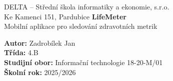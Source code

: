 \begin{titlepage}
    \begin{center}
        DELTA – Střední škola informatiky a ekonomie, s.r.o. \\
        Ke Kamenci 151, Pardubice
        \vfill
        {\Huge \textbf{LifeMeter}}\\[0.5cm]
        {\Large Mobilní aplikace pro sledování zdravotních metrik}
        \vfill
        \begin{flushleft}
            \textbf{Autor:} Zadrobílek Jan\\
            \textbf{Třída:} 4.B\\
            \textbf{Studijní obor:} Informační technologie 18-20-M/01\\
            \textbf{Školní rok:} 2025/2026
        \end{flushleft}
    \end{center}
\end{titlepage}